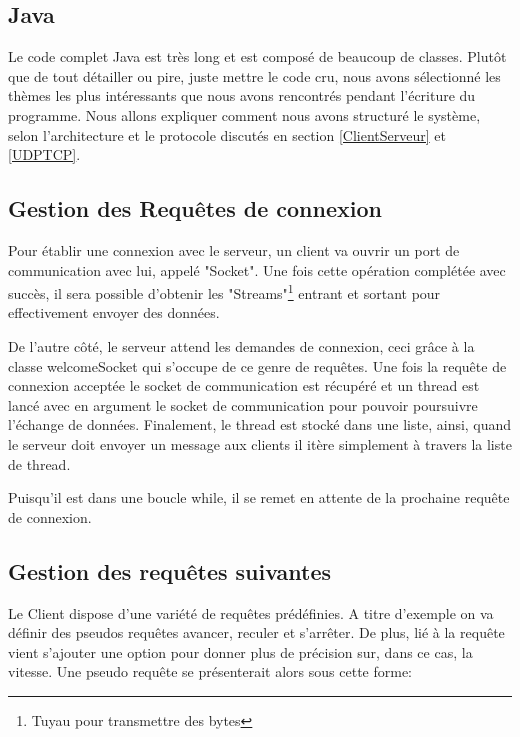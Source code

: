 \documentclass[a4paper,11pt]{report}
\begin{document}
{\begin{enumerate}
\begin{enumerate}
\section{Java}
Le code complet Java est très long et est composé de beaucoup de classes. Plutôt que de tout détailler ou pire, juste mettre le code cru, nous avons sélectionné les thèmes les plus intéressants que nous avons rencontrés pendant l'écriture du programme. Nous allons expliquer comment nous avons structuré le système, selon l'architecture et le protocole discutés en section \ref{ClientServeur} et \ref{UDPTCP}.

\subsection{Gestion des Requêtes de connexion}
Pour établir une connexion avec le serveur, un client va ouvrir un port de communication avec lui, appelé "Socket". Une fois cette opération complétée avec succès, il sera possible d'obtenir les "Streams"\footnote{Tuyau pour transmettre des bytes} entrant et sortant pour effectivement envoyer des données.



De l'autre côté, le serveur attend les demandes de connexion, ceci grâce à la classe welcomeSocket qui s'occupe de ce genre de requêtes. Une fois la requête de connexion acceptée le socket de communication est récupéré et un thread est lancé avec en argument le socket de communication pour pouvoir poursuivre l'échange de données. Finalement, le thread est stocké dans une liste, ainsi, quand le serveur doit envoyer un message aux clients il itère simplement à travers la liste de thread.

 
 
 Puisqu'il est dans une boucle while, il se remet en attente de la prochaine requête de connexion.
 
 \subsection{Gestion des requêtes suivantes}
 Le Client dispose d'une variété de requêtes prédéfinies. A titre d'exemple on va définir des pseudos requêtes avancer, reculer et s'arrêter. De plus, lié à la requête vient s'ajouter une option pour donner plus de précision sur, dans ce cas, la vitesse. Une pseudo requête se présenterait alors sous cette forme:
 

\end{enumerate}
\end{enumerate}}
\end{document}
